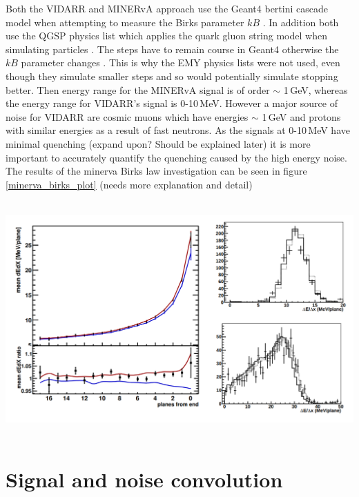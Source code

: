 \documentclass[12pt,a4paper]{article}
\newenvironment{Figure}
  {\par\medskip\noindent\minipage{\linewidth}}
  {\endminipage\par\medskip}
\begin{document}
Both the VIDARR and MINERvA approach use the Geant4 bertini cascade model when attempting to measure the Birks parameter $kB$ \cite{Geant4_bert_cas}. In addition both use the QGSP physics list which applies the quark gluon string model when simulating particles \cite{Minerva_QGSP}. The steps have to remain course in Geant4 otherwise the $kB$ parameter changes  \cite{minerva_birks}. This is why the EMY physics lists were not used, even though they simulate smaller steps and so would potentially simulate stopping better. Then energy range for the MINERvA signal is of order $\sim$ 1\,GeV, whereas the energy range for VIDARR's signal is 0-10\,MeV. However a major source of noise for VIDARR are cosmic muons which have energies $\sim$ 1\,GeV and protons with similar energies as a result of fast neutrons. As the signals at 0-10\,MeV have minimal quenching (expand upon? Should be explained later) it is more important to accurately quantify the quenching caused by the high energy noise. \\

The results of the minerva Birks law investigation can be seen in figure \ref{minerva_birks_plot} (needs more explanation and detail) 

\begin{Figure}
 \centering
 \includegraphics[height=90mm]{minerva_birks_plot.png}
 \label{minerva_birks_plot}
\end{Figure}

\section{Signal and noise convolution}
\end{document}
